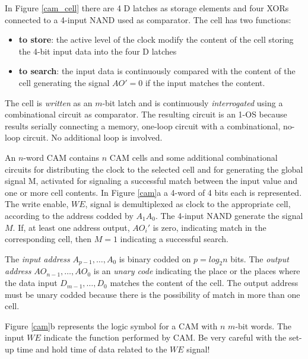 In Figure \ref{cam_cell} there are 4 D latches as storage elements
and four XORs connected to a 4-input NAND used as comparator. The
cell has two functions:
\begin{itemize}
    \item {\bf to store}: the active level of the clock modify the content
    of the cell storing  the 4-bit input data into the four D
    latches
    \item {\bf to search}: the input data is continuously compared
    with the content of the cell generating the signal $AO'=0$ if
    the input matches the content.
\end{itemize}

The cell is {\em written} as an $m$-bit latch and is continuously
{\em interrogated} using a combinational circuit as comparator.
The resulting circuit is an 1-OS because results serially
connecting a memory, one-loop circuit with a combinational,
no-loop circuit. No additional loop is involved.

An $n$-word CAM contains $n$ CAM cells and some additional
combinational circuits for distributing the clock to the selected
cell and for generating the global signal M, activated for
signaling a successful match between the input value and one or
more cell contents. In Figure \ref{cam}a a 4-word of 4 bits each
is represented. The write enable, $WE$, signal is demultiplexed as
clock to the appropriate cell, according to the address codded by
$A_{1}A_{0}$. The 4-input NAND generate the signal $M$. If, at
least one address output, $AO_{i}'$ is zero, indicating match in
the corresponding cell, then $M = 1$ indicating a successful
search.


The {\em input address} $A_{p-1}, \ldots, A_{0}$ is binary codded
on $p = log_{2} n$ bits. The {\em output address} $AO_{n-1},
\ldots, AO_{0}$ is an {\em unary code} indicating the place or the
places where the data input $D_{m-1}, \ldots, D_{0}$ matches the
content of the cell. The output address must be unary codded
because there is the possibility of match in more than one cell.

Figure \ref{cam}b represents the logic symbol for a CAM with $n$
$m$-bit words. The input $WE$ indicate the function performed by
CAM. Be very careful with the set-up time and hold time of data
related to the $WE$ signal!

